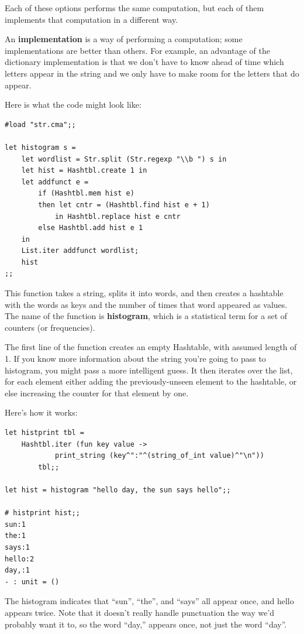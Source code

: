 \documentclass[10pt]{book}
\begin{document}
Each of these options performs the same computation, but each
of them implements that computation in a different way.


An {\bf implementation} is a way of performing a computation;
some implementations are better than others.  For example,
an advantage of the dictionary implementation is that we don't
have to know ahead of time which letters appear in the string
and we only have to make room for the letters that do appear.

Here is what the code might look like:

\beforeverb
\begin{verbatim}
#load "str.cma";;

let histogram s = 
	let wordlist = Str.split (Str.regexp "\\b ") s in
	let hist = Hashtbl.create 1 in
	let addfunct e = 
		if (Hashtbl.mem hist e)
		then let cntr = (Hashtbl.find hist e + 1)
			in Hashtbl.replace hist e cntr
		else Hashtbl.add hist e 1
	in
	List.iter addfunct wordlist;
	hist
;;
\end{verbatim}
\afterverb
%
This function takes a string, splits it into words, and then creates a 
hashtable with the words as keys and the number of times that word 
appeared as values. The name of the function is {\bf histogram}, which 
is a statistical term for a set of counters (or frequencies).


The first line of the function creates an empty Hashtable, with assumed 
length of 1. If you know more information about the string you're going 
to pass to histogram, you might pass a more intelligent guess. It then 
iterates over the list, for each element either adding the previously-unseen
element to the hashtable, or else increasing the counter for that 
element by one.


Here's how it works:

\beforeverb
\begin{verbatim}
let histprint tbl = 
	Hashtbl.iter (fun key value ->
			print_string (key^":"^(string_of_int value)^"\n"))
		tbl;;
		
let hist = histogram "hello day, the sun says hello";;

# histprint hist;;
sun:1
the:1
says:1
hello:2
day,:1
- : unit = ()
\end{verbatim}
\afterverb
%
The histogram indicates that ``sun'', ``the'', and ``says'' all appear once, and hello appears twice. Note that it doesn't really handle punctuation the way we'd probably want it to, so the word ``day,'' appears once, not just the word ``day''.
\end{document}
